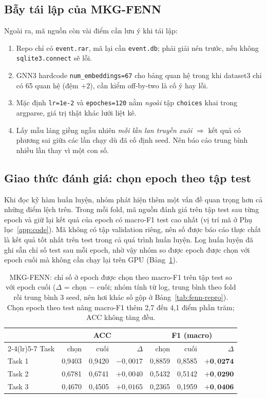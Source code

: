 \documentclass[conference]{IEEEtran}
\newcommand{\hlg}[1]{{\sethlcolor{hlgreen}\hl{#1}}}
\renewcommand{\hl}[1]{#1}
\renewcommand{\colorbox}[2]{#2}
\begin{document}
\subsection{Bẫy tái lập của MKG-FENN}
\hl{Ngoài ra, mã nguồn còn vài điểm cần lưu ý
khi tái lập:}
\begin{enumerate}
  \item Repo chỉ có \texttt{event.rar}, mã lại cần \texttt{event.db}; phải giải
  nén trước, nếu không \texttt{sqlite3.connect} sẽ lỗi.
  \item GNN3 hardcode \texttt{num\_embeddings=67} cho bảng quan hệ trong khi
  dataset3 chỉ có 65 quan hệ (đệm $+2$), cần kiểm off-by-two là cố ý hay lỗi.
  \item Mặc định \texttt{lr=1e-2} và \texttt{epoches=120} nằm \emph{ngoài} tập
  \texttt{choices} khai trong argparse, giá trị thật khác lưới liệt kê.
  \item Lấy mẫu láng giềng ngẫu nhiên \emph{mỗi lần \hlg{lan truyền xuôi}} $\Rightarrow$ kết quả
  có phương sai giữa các lần chạy dù đã cố định seed. Nên báo cáo trung bình nhiều
  lần thay vì một con số.
\end{enumerate}

\subsection{Giao thức đánh giá: chọn epoch theo tập test}
\label{sec:fenn-protocol}
\hl{Khi đọc kỹ hàm huấn luyện, nhóm phát hiện thêm một vấn đề quan trọng hơn cả những điểm lệch trên.
Trong mỗi fold, mã nguồn đánh giá trên tập test sau từng epoch và giữ lại kết quả của epoch có
macro-F1 test cao nhất (vị trí mã ở Phụ lục}\colorbox{yellow}{~\ref{app:code}}\hl{).
Mã không có tập validation riêng, nên số được báo cáo thực chất là kết quả tốt nhất trên test trong cả
quá trình huấn luyện. Log huấn luyện đã ghi sẵn chỉ số test sau mỗi epoch, nhờ vậy nhóm so được epoch
được chọn với epoch cuối mà không cần chạy lại trên GPU (Bảng}\colorbox{yellow}{~\ref{tab:fenn-sel}}\hl{).}

\begin{table}[t]
\caption{MKG-FENN: chỉ số ở epoch được chọn theo macro-F1 trên tập test so với epoch cuối ($\Delta$ = chọn $-$ cuối; nhóm
tính từ log, trung bình theo fold rồi trung bình 3 seed, nên hơi khác số gộp ở Bảng~\ref{tab:fenn-repro}). Chọn epoch
theo test nâng macro-F1 thêm 2,7 đến 4,1 điểm phần trăm; ACC không tăng đều.}
\label{tab:fenn-sel}
\centering\footnotesize
\setlength{\tabcolsep}{3pt}
\begin{tabular}{lrrrrrr}
\toprule
& \multicolumn{3}{c}{ACC} & \multicolumn{3}{c}{F1 (macro)} \\
\cmidrule(lr){2-4}\cmidrule(lr){5-7}
Task & chọn & cuối & $\Delta$ & chọn & cuối & $\Delta$ \\
\midrule
Task 1 & 0,9403 & 0,9420 & $-0{,}0017$ & 0,8859 & 0,8585 & $\mathbf{+0{,}0274}$ \\
Task 2 & 0,6781 & 0,6741 & $+0{,}0040$ & 0,5432 & 0,5142 & $\mathbf{+0{,}0290}$ \\
Task 3 & 0,4670 & 0,4505 & $+0{,}0165$ & 0,2365 & 0,1959 & $\mathbf{+0{,}0406}$ \\
\bottomrule
\end{tabular}
\end{table}
\end{document}
